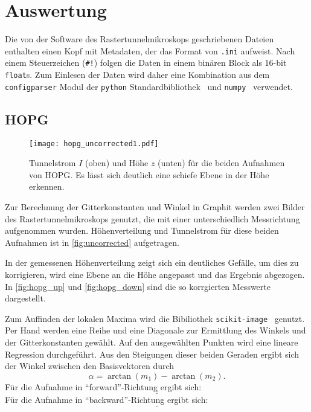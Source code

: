 \section{Auswertung}
\label{sec:Auswertung}

Die von der Software des Rastertunnelmikroskops geschriebenen Dateien enthalten einen Kopf mit Metadaten, der das Format von \texttt{.ini} aufweist.
Nach einem Steuerzeichen (\texttt{\#!}) folgen die Daten in einem binären Block als 16-bit \texttt{float}s.
Zum Einlesen der Daten wird daher eine Kombination aus dem \texttt{configparser} Modul der \texttt{python} Standardbibliothek~\cite{configparser} und \texttt{numpy}~\cite{numpy} verwendet.~\cite{readnid}

\subsection{HOPG}
\begin{figure}
  \centering
  \texttt{[image: hopg\_uncorrected1.pdf]}
  \caption{%
    Tunnelstrom $I$ (oben) und Höhe $z$ (unten) für die beiden Aufnahmen von HOPG.
    Es lässt sich deutlich eine schiefe Ebene in der Höhe erkennen.%
  }\label{fig:uncorrected}
\end{figure}

Zur Berechnung der Gitterkonstanten und Winkel in Graphit werden zwei Bilder des Rastertunnelmikroskops genutzt, die mit einer unterschiedlich Messrichtung aufgenommen wurden.
Höhenverteilung und Tunnelstrom für diese beiden Aufnahmen ist in \autoref{fig:uncorrected} aufgetragen.

In der gemessenen Höhenverteilung zeigt sich ein deutliches Gefälle, um dies zu korrigieren, wird eine Ebene an die Höhe angepasst und das Ergebnis abgezogen.
In \autoref{fig:hopg_up} und \autoref{fig:hopg_down} sind die so korrgierten Messwerte dargestellt.

Zum Auffinden der lokalen Maxima wird die Bibiliothek \texttt{scikit-image}~\cite{skimage} genutzt.
Per Hand werden eine Reihe und eine Diagonale zur Ermittlung des Winkels und der Gitterkonstanten gewählt.
Auf den ausgewählten Punkten wird eine lineare Regression durchgeführt.
Aus den Steigungen dieser beiden Geraden ergibt sich der Winkel zwischen den Basisvektoren durch
\begin{equation}
  α = \arctan(m_1) -\arctan(m_2).
\end{equation}
Für die Aufnahme in \enquote{forward}-Richtung ergibt sich:
\begin{equation}
  .
\end{equation}
Für die Aufnahme in \enquote{backward}-Richtung ergibt sich:
\begin{equation}
  .
\end{equation}

